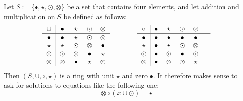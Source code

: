 \begin{example} Let $S:=\{\bullet,\star,\odot,\otimes\}$ be a set that contains four elements, and let addition and multiplication on $S$ be defined as follows:
\begin{equation}\label{moon-table}
  \begin{tabular}{c | c c c c c c}
    $\cup$ & $\bullet$ & $\star$ & $\odot$ & $\otimes$ \\\hline
    $\bullet$ & $\bullet$ & $\star$ & $\odot$ & $\otimes$ \\
    $\star$ & $\star$ & $\odot$ & $\otimes$ & $\bullet$ \\
    $\odot$ & $\odot$ & $\otimes$ & $\bullet$ & $\star$ \\
    $\otimes$ & $\otimes$ & $\bullet$ & $\star$ & $\odot$ \\
  \end{tabular} \quad \quad \quad \quad
  \begin{tabular}{c | c c c c c c}
$ \circ $ & $\bullet$ & $\star$ & $\odot$ & $\otimes$ & \\\hline
        $\bullet$ & $\bullet$ & $\bullet$ & $\bullet$ & $\bullet$ &\\
        $\star$ & $\bullet$ & $\star$ & $\odot$ & $\otimes$ &\\
        $\odot$ & $\bullet$ & $\odot$ & $\bullet$ & $\odot$ &\\
        $\otimes$ & $\bullet$ & $\otimes$ & $\odot$ & $\star$ &\\
  \end{tabular}
\end{equation}
Then $(S,\cup,\circ, \star)$ is a ring with unit $\star$ and zero $\bullet$. It therefore makes sense to ask for solutions to equations like the following one:
\begin{equation}\label{eq:moon}
\otimes \circ (x \cup \odot ) = \star
\end{equation}


\end{example}
